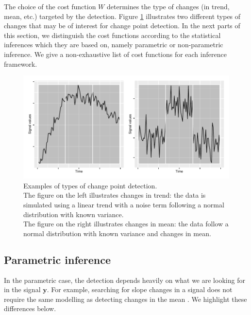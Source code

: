 The choice of the cost function $W$ determines the type of changes (in trend, mean, etc.) targeted by the detection. Figure \ref{fig:ex_cp} illustrates two different types of changes that may be of interest for change point detection. In the next parts of this section, we distinguish the cost functions according to the statistical inferences which they are based on, namely parametric or non-parametric inference. We give a non-exhaustive list of cost functions for each inference framework.

\begin{figure}[ht]
    \centering
    \includegraphics{figs/Chap2/Ex_CP_cost.pdf}
    \caption{Examples of types of change point detection. \\
    The figure on the left illustrates changes in trend: the data is simulated using a linear trend with a noise term following a normal distribution with known variance.\\
    The figure on the right illustrates changes in mean: the data follow a normal distribution with known variance and changes in mean.}
    \label{fig:ex_cp}
\end{figure}

\subsection{Parametric inference}

In the parametric case, the detection depends heavily on what we are looking for in the signal $\bm y$. For example, searching for slope changes in a signal \citep{Bai1994,Fearnhead2018} does not require the same modelling as detecting changes in the mean \citep{Frick2014,chen2012parametric}. We highlight these differences below.

